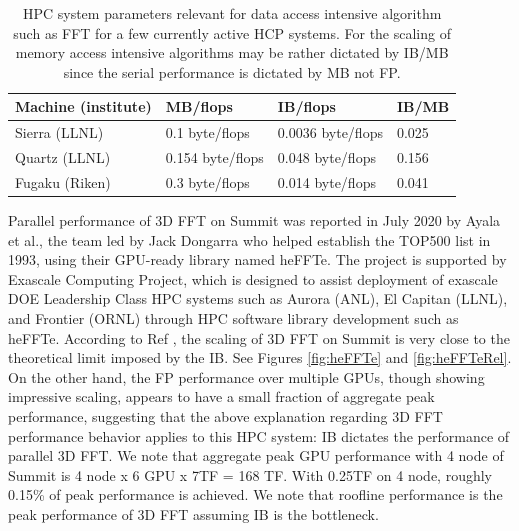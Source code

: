 \begin{table}[ht]
    \centering
    \begin{tabular}{|l|lll|}
    \hline
        Machine (institute) &  MB/flops & IB/flops & IB/MB \\
        \hline
        Sierra (LLNL) &  0.1 byte/flops & 0.0036 byte/flops & 0.025 \\
        Quartz (LLNL) & 0.154 byte/flops & 0.048 byte/flops & 0.156\\
        Fugaku (Riken) &  0.3 byte/flops & 0.014 byte/flops  & 0.041 \\
        \hline
    \end{tabular}
    \caption{HPC system parameters relevant for data access intensive algorithm such as FFT for a few currently active HCP systems. For the scaling of memory access intensive algorithms may be rather dictated by IB/MB since the serial performance is dictated by MB not FP.}
    \label{tab:hpc_performance}
\end{table}

Parallel performance of 3D FFT on Summit was reported in July 2020 by Ayala et al., the team led by Jack Dongarra who helped establish the TOP500 list in 1993,\cite{dongarra500} using their GPU-ready library named heFFTe.\cite{heFFTe2020} The project is supported by Exascale Computing Project, which is designed to assist deployment of exascale DOE Leadership Class HPC systems such as Aurora (ANL), El Capitan (LLNL), and Frontier (ORNL) through HPC software library development such as heFFTe. According to Ref \cite{heFFTe2020}, the scaling of 3D FFT on Summit is very close to the theoretical limit imposed by the IB. See Figures \ref{fig:heFFTe} and \ref{fig:heFFTeRel}. On the other hand, the FP performance over multiple GPUs, though showing impressive scaling, appears to have a small fraction of aggregate peak performance, suggesting that the above explanation regarding 3D FFT performance behavior applies to this HPC system: IB dictates the performance of parallel 3D FFT. We note that aggregate peak GPU performance with 4 node of Summit is 4 node x 6 GPU x 7TF = 168 TF. With 0.25TF on 4 node, roughly 0.15\% of peak performance is achieved. We note that roofline performance is the peak performance of 3D FFT assuming IB is the bottleneck. 

